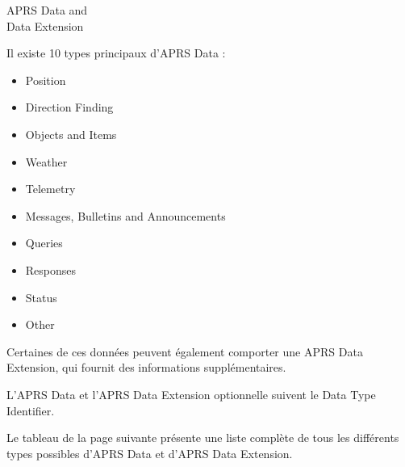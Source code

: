 \begin{aprssideblock}{APRS Data and\\Data Extension}
\label{aprs-data-and-data-extension}
Il existe 10 types principaux d'APRS Data :

\begin{itemize}
\tightlist
\item
  Position
\item
  Direction Finding
\item
  Objects and Items
\item
  Weather
\item
  Telemetry
\item
  Messages, Bulletins and Announcements
\item
  Queries
\item
  Responses
\item
  Status
\item
  Other
\end{itemize}

Certaines de ces données peuvent également comporter une APRS Data
Extension, qui fournit des informations supplémentaires.

L'APRS Data et l'APRS Data Extension optionnelle suivent le Data Type
Identifier.

Le tableau de la page suivante présente une liste complète de tous les
différents types possibles d'APRS Data et d'APRS Data Extension.
\end{aprssideblock}

